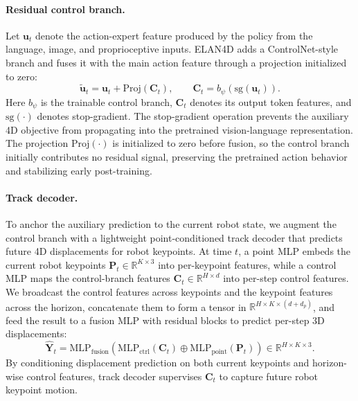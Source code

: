 \paragraph{Residual control branch.}
Let \(\mathbf{u}_{t}\) denote the action-expert feature produced by the policy from the language, image, and proprioceptive inputs. ELAN4D adds a ControlNet-style branch and fuses it with the main action feature through a projection initialized to zero:
\begin{equation}
\widetilde{\mathbf{u}}_{t} = \mathbf{u}_{t} + \mathrm{Proj}(\mathbf{C}_{t}), \qquad \mathbf{C}_{t} = b_{\psi}(\mathrm{sg}(\mathbf{u}_{t})).
\end{equation}
Here \(b_{\psi}\) is the trainable control branch, \(\mathbf{C}_{t}\) denotes its output token features, and \(\mathrm{sg}(\cdot)\) denotes stop-gradient. The stop-gradient operation
prevents the auxiliary 4D objective from propagating into the pretrained vision-language representation. The projection \(\mathrm{Proj}(\cdot)\) is initialized to zero before fusion,
so the control branch initially contributes no residual signal, preserving the pretrained action behavior and stabilizing early post-training.\vspace{-1em}

\paragraph{Track decoder.}
To anchor the auxiliary prediction to the current robot state, we augment the control branch with a lightweight point-conditioned track decoder that predicts future 4D displacements for robot keypoints. At time \(t\), a point MLP embeds the current robot keypoints \(\mathbf{P}_t \in \mathbb{R}^{K \times 3}\) into per-keypoint features, while a control MLP maps the control-branch features \(\mathbf{C}_t \in \mathbb{R}^{H \times d}\) into per-step control features. We broadcast the control features across keypoints and the keypoint features across the horizon, concatenate them to form a tensor in \(\mathbb{R}^{H \times K \times (d + d_p)}\), and feed the result to a fusion MLP with residual blocks to predict per-step 3D displacements:
\begin{equation}
\widehat{\mathbf{Y}}_t = \mathrm{MLP}_{\mathrm{fusion}} \!\left( \mathrm{MLP}_{\mathrm{ctrl}}(\mathbf{C}_t) \oplus \mathrm{MLP}_{\mathrm{point}}(\mathbf{P}_t) \right) \in \mathbb{R}^{H \times K \times 3}.
\end{equation}
By conditioning displacement prediction on both current keypoints and horizon-wise control features, track decoder supervises \(\mathbf{C}_t\) to capture future robot keypoint motion. %

